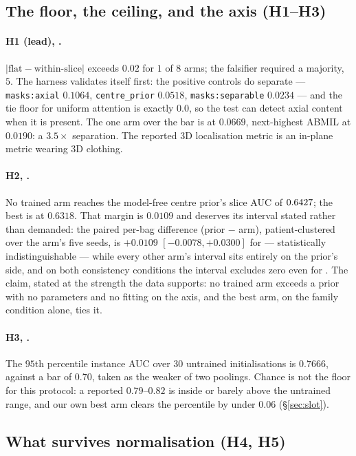 \documentclass[10pt]{article}
\begin{document}
\subsection{The floor, the ceiling, and the axis (H1--H3)}

\paragraph{H1 (lead), \PASS{}.} $|{\text{flat}} - {\text{within-slice}}|$ exceeds
$0.02$ for $1$ of $8$ arms; the falsifier required a majority, $5$. The harness
validates itself first: the positive controls do separate --- \texttt{masks:axial}
$0.1064$, \texttt{centre\_prior} $0.0518$, \texttt{masks:separable} $0.0234$ ---
and the tie floor for uniform attention is exactly $0.0$, so the test can detect
axial content when it is present. The one arm over the bar is \armNG{} at
$0.0669$, next-highest ABMIL at $0.0190$: a $3.5\times$ separation.
The reported 3D localisation metric is an in-plane metric wearing 3D clothing.

\paragraph{H2, \PASS{}.} No trained arm reaches the model-free centre prior's
slice AUC of $0.6427$; the best is \armNG{} at $0.6318$. That
margin is $0.0109$ and deserves its interval stated rather than demanded: the
paired per-bag difference (prior $-$ arm), patient-clustered over the arm's
five seeds, is $+0.0109$ $[-0.0078, +0.0300]$ for \armNG{} ---
statistically indistinguishable --- while every other arm's interval sits
entirely on the prior's side, and on both consistency conditions the interval
excludes zero even for \armNG{}. The claim, stated at the strength the data
supports: no trained arm exceeds a prior with no parameters and no fitting on
the axis, and the best arm, on the family condition alone, ties it.

\paragraph{H3, \PASS{}.} The $95$th percentile instance AUC over $30$ untrained
initialisations is $0.7666$, against a bar of $0.70$, taken as the weaker of two
poolings. Chance is not the floor for this protocol: a reported $0.79$--$0.82$
is inside or barely above the untrained range, and our own best arm clears the
percentile by under $0.06$ (\S\ref{sec:slot}).

\subsection{What survives normalisation (H4, H5)}
\label{sec:h4h5}
\end{document}
